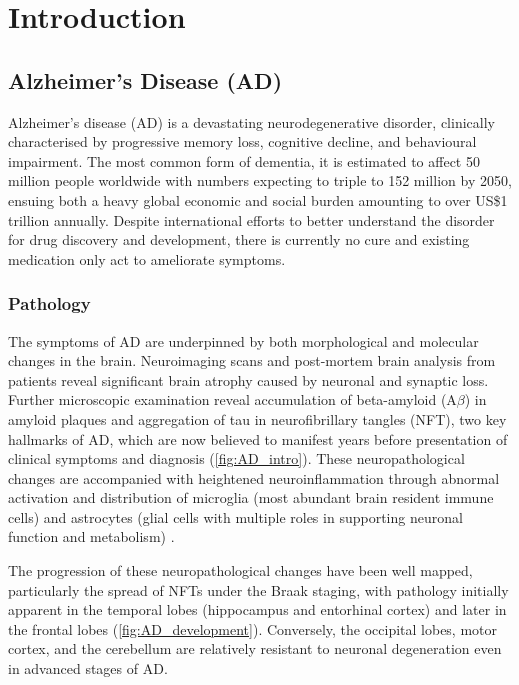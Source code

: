 \chapter{Introduction}

\section{Alzheimer's Disease (AD)}

Alzheimer’s disease (AD) is a devastating neurodegenerative disorder, clinically characterised by progressive memory loss, cognitive decline, and behavioural impairment. The most common form of dementia, it is estimated to affect 50 million people worldwide with numbers expecting to triple to 152 million by 2050, ensuing both a heavy global economic and social burden amounting to over US\$1 trillion annually\cite{International2020}. Despite international efforts to better understand the disorder for drug discovery and development, there is currently no cure and existing medication only act to ameliorate symptoms.

\subsection{Pathology}
The symptoms of AD are underpinned by both morphological and molecular changes in the brain. Neuroimaging scans and post-mortem brain analysis from patients reveal significant brain atrophy caused by neuronal and synaptic loss\cite{Selkoe1991,Perl2010}. Further microscopic examination reveal accumulation of beta-amyloid (A$\beta$) in amyloid plaques and aggregation of tau in neurofibrillary tangles (NFT), two key hallmarks of AD, which are now believed to manifest years before presentation of clinical symptoms and diagnosis (\cref{fig:AD_intro})\cite{Sperling2011}. These neuropathological changes are accompanied with heightened neuroinflammation through abnormal activation and distribution of microglia (most abundant brain resident immune cells) and astrocytes (glial cells with multiple roles in supporting neuronal function and metabolism) \cite{Heneka2015}. 

The progression of these neuropathological changes have been well mapped, particularly the spread of NFTs under the Braak staging\cite{H1991},  with pathology initially apparent in the temporal lobes (hippocampus and entorhinal cortex) and later in the frontal lobes (\cref{fig:AD_development}). Conversely, the occipital lobes, motor cortex, and the cerebellum are relatively resistant to neuronal degeneration even in advanced stages of AD\cite{Xu2019}.

